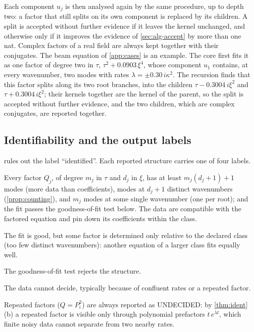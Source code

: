 \documentclass[11pt]{article}
\theoremstyle{plain}
\theoremstyle{definition}
\theoremstyle{remark}
\newcommand{\lab}[1]{\textsf{#1}}           %
\newcommand{\FC}{\lab{FIT-COMPATIBLE}}
\newcommand{\IDK}{\lab{ID-KER}}
\newcommand{\MIS}{\lab{MISFIT}}
\newcommand{\UND}{\lab{UNDECIDED}}
\begin{document}
Each component $u_j$ is then analysed again by the same procedure, up to depth two: a factor that still
splits on its own component is replaced by its children. A split is accepted without further evidence
if it leaves the kernel unchanged, and otherwise only if it improves the evidence of \cref{sec:alg-accept} by more
than one nat. Complex factors of a real field are always kept together with their conjugates. The beam equation of
\cref{app:cases} is an example. The core first fits it as one factor of degree two in $\tau$,
$\tau^2+0.0903\,\xi^4$, whose component $u_1$ contains, at every wavenumber, two modes with rates
$\lambda=\pm0.30\,i\kappa^2$. The recursion finds that this factor splits along its two root branches, into the children
$\tau-0.3004\,i\xi^2$ and $\tau+0.3004\,i\xi^2$; their kernels together are the kernel of the parent, so the split is
accepted without further evidence, and the two children, which are complex conjugates, are reported together.

\subsection{Identifiability and the output labels}\label{sec:alg-labels}
 rules out the label ``identified''. Each reported structure carries one of four labels.
\begin{description}[leftmargin=2.9cm,labelwidth=2.7cm]
  \item[\FC] Every factor $Q_j$, of degree $m_j$ in $\tau$ and $d_j$ in $\xi$, has at least $m_j(d_j+1)+1$ modes
  (more data than coefficients), modes at $d_j+1$ distinct wavenumbers (\cref{prop:counting}), and $m_j$ modes
  at some single wavenumber (one per root); and the fit passes the goodness-of-fit test below.
  The data are compatible with the factored equation and pin down its coefficients within the class.
  \item[\IDK] The fit is good, but some factor is determined only relative to the declared class (too
  few distinct wavenumbers): another equation of a larger class fits equally well.
  \item[\MIS] The goodness-of-fit test rejects the structure.
  \item[\UND] The data cannot decide, typically because of confluent rates or a repeated factor.
\end{description}
Repeated factors ($Q=P_i^2$) are always reported as \UND: by \cref{thm:ident}(b) a repeated factor is
visible only through polynomial prefactors $t\,e^{\lambda t}$, which finite noisy data cannot separate from
two nearby rates.
\end{document}
